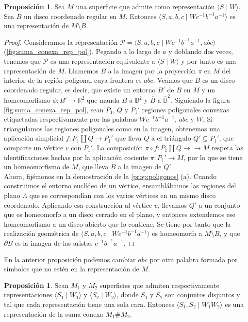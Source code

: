 \documentclass[10pt]{report}
\newcommand{\R}{\mathbb{R}}
\theoremstyle{definition}
\newtheorem{prop}[defin]{Proposición}
\begin{document}
\begin{prop}\label{prop:rep_perf}
Sea $M$ una superficie que admite como representación $\langle S\mid W\rangle$. Sea $B$ un disco coordenado regular en $M$. Entonces $\langle S,a,b,c\mid Wc^{-1}b^{-1}a^{-1}\rangle$ es una representación de $M\setminus B$.
\end{prop}
\begin{proof}
Consideramos la representación $\mathcal{P}=\langle S,a,b,c\mid Wc^{-1}b^{-1}a^{-1},abc\rangle$ (\autoref{fig:suma_conexa_rep_pol}). Pegando a lo largo de $a$ y doblando dos veces, tenemos que $\mathcal{P}$ es una representación equivalente a $\langle S\mid W\rangle$ y por tanto es una representación de $M$. Llamemos $B$ a la imagen por la proyección $\pi$ en $M$ del interior de la región poligonal cuya frontera es $abc$. Veamos que $B$ es un disco coordenado regular, es decir, que existe un entorno $B'$ de $B$ en $M$ y un homeomorfismo $\phi :B'\to \R^2$ que manda $B$ a $\mathbb{B}^2$ y $\overline{B}$ a $\overline{\mathbb{B}}^2$. Siguiendo la figura \autoref{fig:suma_conexa_rep_pol}, sean $P_1$, $Q$ y $P_1'$ regiones poligonales convexas etiquetadas respectivamente por las palabras $Wc^{-1}b^{-1}a^{-1}$, $abc$ y $W$. Si triangulamos las regiones poligonales como en la  imagen, obtenemos una aplicación simplicial $f:P_1\amalg Q\to P_1'$ que lleva $Q$ a el triángulo $Q'\subseteq P_1'$, que comparte un vértice $v$ con $P_1'$. La composición $\pi \circ f: P_1\amalg Q\to \to M$ respeta las identificaciones hechas por la aplicación cociente $\pi :P_1'\to M$, por lo que se tiene un homeomorfismo de $M$, que lleva $B$ a la imagen de $Q'$.\\
Ahora, fijémonos en la demostración de la \autoref{prop:poligonos} (a). Cuando construimos el entorno euclídeo de un vértice, ensamblábamos las regiones del plano $\Lambda$ que se correspondían con los varios vértices en un mismo disco coordenado. Aplicando esa construcción al vértice $v$, llevamos $Q'$ a un conjunto que es homeomorfo a un disco cerrado en el plano, y  entonces extendemos ese homeomorfismo a un disco abierto que lo contiene. Se tiene por tanto que la realización geométrica de $\langle S,a,b,c\mid Wc^{-1}b^{-1}a^{-1}\rangle$ es homeomorfa a $M\setminus B$, y que $\partial B$ es la imagen de las aristas $c^{-1}b^{-1}a^{-1}$.
\end{proof}
En la anterior proposición podemos cambiar $abc$ por otra palabra formada por símbolos que no estén en la representación de $M$.


\begin{prop}%
Sean $M_1$ y $M_2$ superficies que admiten respectivamente representaciones $\langle S_1\mid W_1\rangle $ y $\langle S_2\mid W_2\rangle $, donde $S_1$ y $S_2$ son conjuntos disjuntos y tal que cada representación tiene una sola cara. Entonces $\langle S_1,S_2\mid W_1W_2\rangle$ es una representación de la suma conexa $M_1 \# M_2$.

\end{prop}
\end{document}
